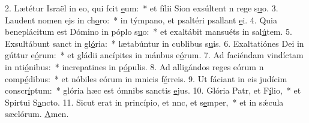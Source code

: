 2. Lætétur Israël in eo, qui fcit \uline{e}um:~* et fílii Sion exsúltent n rege s\uline{u}o.
3. Laudent nomen ejs in ch\uline{o}ro:~* in týmpano, et psaltéri psallant \uline{e}i.
4. Quia beneplácitum est Dómino in póplo s\uline{u}o:~* et exaltábit mansuéts in sal\uline{ú}tem.
5. Exsultábunt sanct in gl\uline{ó}ria:~* lætabúntur in cublibus s\uline{u}is.
6. Exaltatiónes Dei in gúttur e\uline{ó}rum:~* et gládii ancípites in mánbus e\uline{ó}rum.
7. Ad faciéndam vindíctam in nti\uline{ó}nibus:~* increpatines in p\uline{ó}pulis.
8. Ad alligándos reges eórum n comp\uline{é}dibus:~* et nóbiles eórum in mnicis f\uline{é}rreis.
9. Ut fáciant in eis judícim conscr\uline{í}ptum:~* glória hæc est ómnibs sanctis \uline{e}jus.
10. Glória Patr, et F\uline{í}lio,~* et Spirtui S\uline{a}ncto.
11. Sicut erat in princípio, et nnc, et s\uline{e}mper,~* et in sǽcula sæclórum. \uline{A}men.
